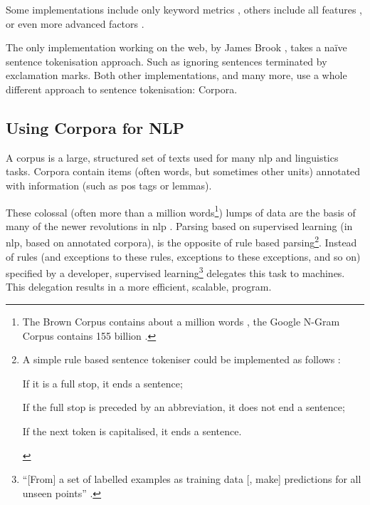 \noindent Some implementations include only keyword metrics
  \autocite{jbrooksuk/node-summary-source-code}, others include all features
  \autocite{MojoJolo/textteaser-source-code}, or even more advanced factors
  \autocite{summly}.

The only implementation working on the web, by James Brook
  \autocite*{jbrooksuk/node-summary-source-code}, takes a na\"ive sentence
  tokenisation approach.
Such as ignoring sentences terminated by exclamation marks.
Both other implementations, and many more, use a whole different approach to
  sentence tokenisation: Corpora.

\subsection{Using Corpora for NLP}\label{using-corpora-for}

A corpus is a large, structured set of texts used for many \gls{nlp}
  and linguistics tasks.
Corpora contain items (often words, but sometimes other units) annotated
  with information (such as \gls{pos} tags or lemmas).

These colossal (often more than a million words\footnote{The Brown Corpus
    contains about a million words \autocite{francis-nelson-brown-corpus},
    the Google N-Gram Corpus contains 155 billion
    \autocite{brants-thorsten-google-ngram-corpus}.})
  lumps of data are the basis of many of the newer revolutions in \gls{nlp}
  \autocite{mitkov-ruslan-ea-importance-corpora}.
Parsing based on supervised learning (in \gls{nlp}, based on annotated
  corpora), is the opposite of rule based parsing\footnote{A simple
    rule based sentence tokeniser could be implemented as follows
    \autocite{attivio.com-doing-things-with-sentences}:

    \begin{aenumerate}
      \item If it is a full stop, it ends a sentence;
      \item If the full stop is preceded by an abbreviation, it does not end
        a sentence;
      \item If the next token is capitalised, it ends a sentence.
    \end{aenumerate}}.
Instead of rules (and exceptions to these rules, exceptions to these
  exceptions, and so on) specified by a developer,
  supervised learning\footnote{``{[}From{]} a set of labelled examples as
    training data {[}, make{]} predictions for all unseen points''
    \autocite{mohri-mehryar-foundations-machine-learning}.}
  delegates this task to machines.
This delegation results in a more efficient, scalable, program.

